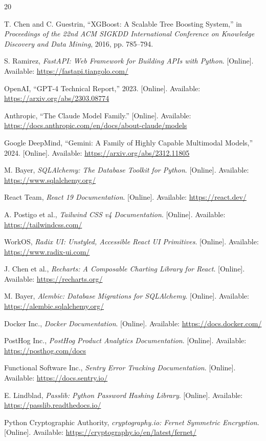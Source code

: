 \documentclass[12pt,a4paper]{report}
\begin{document}
\begin{thebibliography}{20}

T. Chen and C. Guestrin, ``XGBoost: A Scalable Tree Boosting System,'' in \textit{Proceedings of the 22nd ACM SIGKDD International Conference on Knowledge Discovery and Data Mining}, 2016, pp. 785--794.

S. Ramirez, \textit{FastAPI: Web Framework for Building APIs with Python}. [Online]. Available: \url{https://fastapi.tiangolo.com/}

OpenAI, ``GPT-4 Technical Report,'' 2023. [Online]. Available: \url{https://arxiv.org/abs/2303.08774}

Anthropic, ``The Claude Model Family.'' [Online]. Available: \url{https://docs.anthropic.com/en/docs/about-claude/models}

Google DeepMind, ``Gemini: A Family of Highly Capable Multimodal Models,'' 2024. [Online]. Available: \url{https://arxiv.org/abs/2312.11805}

M. Bayer, \textit{SQLAlchemy: The Database Toolkit for Python}. [Online]. Available: \url{https://www.sqlalchemy.org/}

React Team, \textit{React 19 Documentation}. [Online]. Available: \url{https://react.dev/}

A. Postigo et al., \textit{Tailwind CSS v4 Documentation}. [Online]. Available: \url{https://tailwindcss.com/}

WorkOS, \textit{Radix UI: Unstyled, Accessible React UI Primitives}. [Online]. Available: \url{https://www.radix-ui.com/}

J. Chen et al., \textit{Recharts: A Composable Charting Library for React}. [Online]. Available: \url{https://recharts.org/}

M. Bayer, \textit{Alembic: Database Migrations for SQLAlchemy}. [Online]. Available: \url{https://alembic.sqlalchemy.org/}

Docker Inc., \textit{Docker Documentation}. [Online]. Available: \url{https://docs.docker.com/}

PostHog Inc., \textit{PostHog Product Analytics Documentation}. [Online]. Available: \url{https://posthog.com/docs}

Functional Software Inc., \textit{Sentry Error Tracking Documentation}. [Online]. Available: \url{https://docs.sentry.io/}

E. Lindblad, \textit{Passlib: Python Password Hashing Library}. [Online]. Available: \url{https://passlib.readthedocs.io/}

Python Cryptographic Authority, \textit{cryptography.io: Fernet Symmetric Encryption}. [Online]. Available: \url{https://cryptography.io/en/latest/fernet/}

\end{thebibliography}
\end{document}
